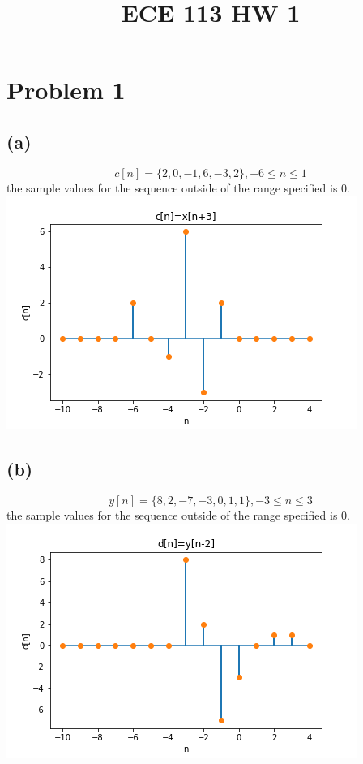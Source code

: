 
\title{ECE 113 HW 1}

\maketitle
\section*{Problem 1}
\subsection*{(a)}
$$\boxed{c[n]=\{2, 0, -1, 6, -3, 2\}, -6\leq n \leq1}$$ 
the sample values for the sequence outside of the range specified
is 0.\\
\includegraphics[scale=0.5]{c.png}
\subsection*{(b)}
$$\boxed{y[n]=\{8, 2, -7, -3, 0, 1, 1\}, -3\leq n \leq3}$$ 
the sample values for the sequence outside of the range specified
is 0.\\
\includegraphics[scale=0.5]{d.png}
